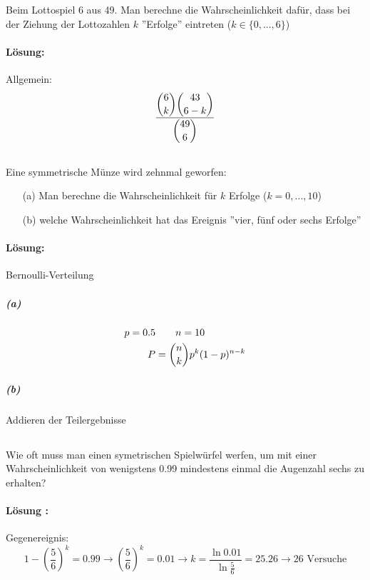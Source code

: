 \documentclass[ngerman]{scrartcl}
\begin{document}
\subsection{}
Beim Lottospiel 6 aus 49. Man berechne die Wahrscheinlichkeit dafür, dass bei der Ziehung der Lottozahlen $k$ ''Erfolge''  eintreten ($k \in \lbrace0,...,6\rbrace$)
\paragraph{Lösung:}
Allgemein:
\begin{equation*}
\frac{\dbinom{6}{k}\dbinom{43}{6-k}}{\dbinom{49}{6}}
\end{equation*}

\subsection{}
Eine symmetrische Münze wird zehnmal geworfen:
\begin{enumerate}
\item[(a)] Man berechne die Wahrscheinlichkeit für $k$ Erfolge ($k = 0,...,10$)
\item[(b)] welche Wahrscheinlichkeit hat das Ereignis ''vier, fünf oder sechs Erfolge''
\end{enumerate}
\paragraph{Lösung:}
Bernoulli-Verteilung
\subparagraph{(a)}
\begin{align*}
p = 0.5 &\qquad n = 10\\
P &=  \dbinom{n}{k} p^{k} (1-p)^{n-k}
\end{align*}
\subparagraph{(b)} Addieren der Teilergebnisse
\subsection{}
Wie oft muss man einen symetrischen Spielwürfel werfen, um mit einer Wahrscheinlichkeit von wenigstens 0.99 mindestens einmal die Augenzahl sechs zu erhalten?
\paragraph{Lösung :}
Gegenereignis:
\begin{equation*}
1- \left(\frac{5}{6}\right)^{k} = 0.99 \rightarrow \left(\frac{5}{6}\right)^{k} = 0.01 
\rightarrow k = \frac{\ln 0.01}{\ln \frac{5}{6}} = 25.26 \rightarrow 26 \text{ Versuche}
\end{equation*}
\end{document}
